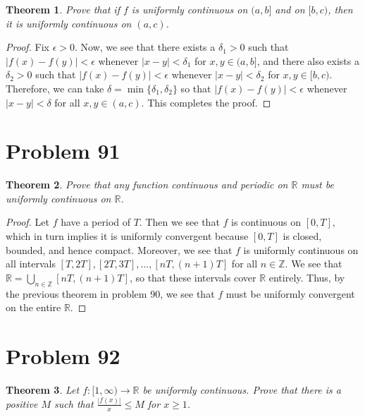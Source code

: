 \documentclass[psamsfonts]{amsart}
\newtheorem{thm}{Theorem}[section]
\theoremstyle{definition}
\theoremstyle{remark}
\numberwithin{equation}{section}
\begin{document}
\begin{thm}
Prove that if $f$ is uniformly continuous on $(a,b]$ and on $[b,c)$, then it is uniformly continuous on $(a,c)$. 
\end{thm}

\begin{proof}
Fix $\epsilon > 0$. Now, we see that there exists a $\delta_1 > 0$ such that $|f(x) - f(y)| < \epsilon$ whenever $|x - y| < \delta_1$ for $x,y \in (a,b]$, and there also exists a $\delta_2 > 0$ such that $|f(x) - f(y) | < \epsilon$ whenever $|x-y| < \delta_2$ for $x,y \in [b,c)$. Therefore, we can take $\delta = \min \{ \delta_1, \delta_2 \}$ so that $|f(x) - f(y) | < \epsilon$ whenever $|x-y| < \delta$ for all $x,y \in (a,c)$. This completes the proof.
\end{proof}

\section{Problem 91}

\begin{thm}
Prove that any function continuous and periodic on $\mathbb{R}$ must be uniformly continuous on $\mathbb{R}$. 
\end{thm}

\begin{proof}
Let $f$ have a period of $T$. Then we see that $f$ is continuous on $[0,T]$, which in turn implies it is uniformly convergent because $[0,T]$ is closed, bounded, and hence compact. Moreover, we see that $f$ is uniformly continuous on all intervals $[T,2T], [2T,3T], \ldots, [nT, (n+1)T]$ for all $n \in \mathbb{Z}$. We see that $\mathbb{R} = \bigcup_{n \in \mathbb{Z}} [nT, (n+1)T]$, so that these intervals cover $\mathbb{R}$ entirely. Thus, by the previous theorem in problem 90, we see that $f$ must be uniformly convergent on the entire $\mathbb{R}$.
\end{proof}

\section{Problem 92}

\begin{thm}
Let $f:[1,\infty) \to \mathbb{R}$ be uniformly continuous. Prove that there is a positive $M$ such that $\frac{|f(x)|}{x} \leq M$ for $x \geq 1$. 
\end{thm}
\end{document}
